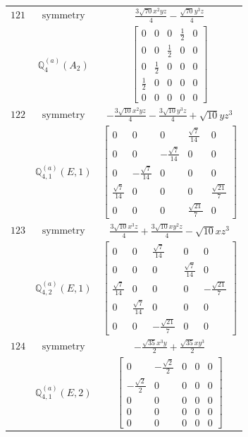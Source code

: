 \documentclass[fleqn,8pt,landscape]{jsarticle}
\begin{document}
\begin{longtable}{ccc}
$ 121 $ & $ \text{symmetry} $ & $ \frac{3 \sqrt{70} x^{2} y z}{4} - \frac{\sqrt{70} y^{3} z}{4} $ \\
$  $ & $ \mathbb{Q}_{4}^{(a)}(A_{2}) $ & $ \begin{bmatrix} 0 & 0 & 0 & \frac{1}{2} & 0 \\ 0 & 0 & \frac{1}{2} & 0 & 0 \\ 0 & \frac{1}{2} & 0 & 0 & 0 \\ \frac{1}{2} & 0 & 0 & 0 & 0 \\ 0 & 0 & 0 & 0 & 0 \end{bmatrix} $ \\ \hline
$ 122 $ & $ \text{symmetry} $ & $ - \frac{3 \sqrt{10} x^{2} y z}{4} - \frac{3 \sqrt{10} y^{3} z}{4} + \sqrt{10} y z^{3} $ \\
$  $ & $ \mathbb{Q}_{4,1}^{(a)}(E,1) $ & $ \begin{bmatrix} 0 & 0 & 0 & \frac{\sqrt{7}}{14} & 0 \\ 0 & 0 & - \frac{\sqrt{7}}{14} & 0 & 0 \\ 0 & - \frac{\sqrt{7}}{14} & 0 & 0 & 0 \\ \frac{\sqrt{7}}{14} & 0 & 0 & 0 & \frac{\sqrt{21}}{7} \\ 0 & 0 & 0 & \frac{\sqrt{21}}{7} & 0 \end{bmatrix} $ \\ \hline
$ 123 $ & $ \text{symmetry} $ & $ \frac{3 \sqrt{10} x^{3} z}{4} + \frac{3 \sqrt{10} x y^{2} z}{4} - \sqrt{10} x z^{3} $ \\
$  $ & $ \mathbb{Q}_{4,2}^{(a)}(E,1) $ & $ \begin{bmatrix} 0 & 0 & \frac{\sqrt{7}}{14} & 0 & 0 \\ 0 & 0 & 0 & \frac{\sqrt{7}}{14} & 0 \\ \frac{\sqrt{7}}{14} & 0 & 0 & 0 & - \frac{\sqrt{21}}{7} \\ 0 & \frac{\sqrt{7}}{14} & 0 & 0 & 0 \\ 0 & 0 & - \frac{\sqrt{21}}{7} & 0 & 0 \end{bmatrix} $ \\ \hline
$ 124 $ & $ \text{symmetry} $ & $ - \frac{\sqrt{35} x^{3} y}{2} + \frac{\sqrt{35} x y^{3}}{2} $ \\
$  $ & $ \mathbb{Q}_{4,1}^{(a)}(E,2) $ & $ \begin{bmatrix} 0 & - \frac{\sqrt{2}}{2} & 0 & 0 & 0 \\ - \frac{\sqrt{2}}{2} & 0 & 0 & 0 & 0 \\ 0 & 0 & 0 & 0 & 0 \\ 0 & 0 & 0 & 0 & 0 \\ 0 & 0 & 0 & 0 & 0 \end{bmatrix} $ \\ \hline

\end{longtable}
\end{document}
